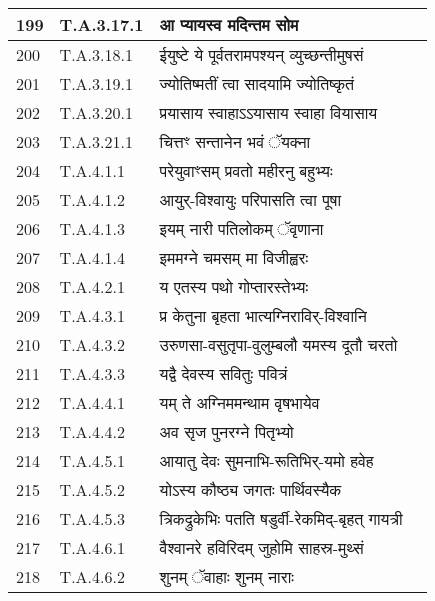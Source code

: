 \documentclass[17pt]{extarticle}
\begin{document}
\begin{longtable}{||p{0.4in}||p{0.9in}||p{4.0in}||p{0.9in}||}
        \hline
            199 & T.A.3.17.1 & आ प्यायस्व मदिन्तम सोम &      \\
        \hline
            200 & T.A.3.18.1 & ईयुष्टे ये पूर्वतरामपश्यन् व्युच्छन्तीमुषसं &      \\
        \hline
            201 & T.A.3.19.1 & ज्योतिष्मतीं त्वा सादयामि ज्योतिष्कृतं &      \\
        \hline
            202 & T.A.3.20.1 & प्रयासाय स्वाहाऽऽयासाय स्वाहा वियासाय &      \\
        \hline
            203 & T.A.3.21.1 & चित्तꣳ सन्तानेन भवं ॅयक्ना &      \\
        \hline
            204 & T.A.4.1.1 & परेयुवाꣳसम् प्रवतो महीरनु बहुभ्यः &      \\
        \hline
            205 & T.A.4.1.2 & आयुर्{-}विश्वायुः परिपासति त्वा पूषा &      \\
        \hline
            206 & T.A.4.1.3 & इयम् नारी पतिलोकम् ॅवृणाना &      \\
        \hline
            207 & T.A.4.1.4 & इममग्ने चमसम् मा विजीह्वरः &      \\
        \hline
            208 & T.A.4.2.1 & य एतस्य पथो गोप्तारस्तेभ्यः &      \\
        \hline
            209 & T.A.4.3.1 & प्र केतुना बृहता भात्यग्निराविर्{-}विश्वानि &      \\
        \hline
            210 & T.A.4.3.2 & उरुणसा{-}वसुतृपा{-}वुलुम्बलौ यमस्य दूतौ चरतो &      \\
        \hline
            211 & T.A.4.3.3 & यद्वै देवस्य सवितुः पवित्रं &      \\
        \hline
            212 & T.A.4.4.1 & यम् ते अग्निममन्थाम वृषभायेव &      \\
        \hline
            213 & T.A.4.4.2 & अव सृज पुनरग्ने पितृभ्यो &      \\
        \hline
            214 & T.A.4.5.1 & आयातु देवः सुमनाभि{-}रूतिभिर्{-}यमो हवेह &      \\
        \hline
            215 & T.A.4.5.2 & योऽस्य कौष्ठ्य जगतः पार्थिवस्यैक &      \\
        \hline
            216 & T.A.4.5.3 & त्रिकद्रुकेभिः पतति षडुर्वी{-}रेकमिद्{-}बृहत् गायत्री &      \\
        \hline
            217 & T.A.4.6.1 & वैश्वानरे हविरिदम् जुहोमि साहस्र{-}मुथ्सं &      \\
        \hline
            218 & T.A.4.6.2 & शुनम् ॅवाहाः शुनम् नाराः &      \\
        \hline

\end{longtable}
\end{document}
